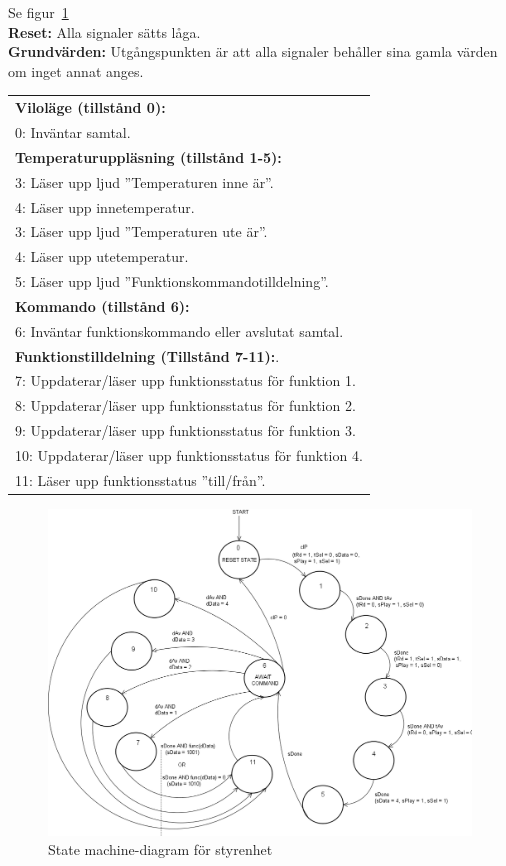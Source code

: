 \documentclass[a4paper,11pt]{article}
\begin{document}
			Se figur~\ref{fig:CUSM}\\
			{\bf Reset:} Alla signaler sätts låga.\\
			{\bf Grundvärden:} Utgångspunkten är att alla signaler behåller sina gamla värden om inget annat anges.\\
			\begin{tabular}{l}
				\\{\bf Viloläge (tillstånd 0):}\\
				0: Inväntar samtal.\\
				{\bf Temperaturuppläsning (tillstånd 1-5):}\\
				3: Läser upp ljud ''Temperaturen inne är''.\\
				4: Läser upp innetemperatur.\\
				3: Läser upp ljud ''Temperaturen ute är''.\\
				4: Läser upp utetemperatur.\\
				5: Läser upp ljud ''Funktionskommandotilldelning''.\\
				{\bf Kommando (tillstånd 6):}\\
				6: Inväntar funktionskommando eller avslutat samtal.\\
				{\bf Funktionstilldelning (Tillstånd 7-11):}.\\
				7: Uppdaterar/läser upp funktionsstatus för funktion 1.\\
				8: Uppdaterar/läser upp funktionsstatus för funktion 2.\\
				9: Uppdaterar/läser upp funktionsstatus för funktion 3.\\
				10: Uppdaterar/läser upp funktionsstatus för funktion 4.\\
				11: Läser upp funktionsstatus ''till/från''.\\
			\end{tabular}

	\begin{figure}[H]
	  \centering
	      \includegraphics[scale=0.4, angle=0]{ControlUnitStateMachineDiagram.png}
	  	\caption{State machine-diagram för styrenhet}
		\label{fig:CUSM}
	\end{figure}
	
\end{document}
